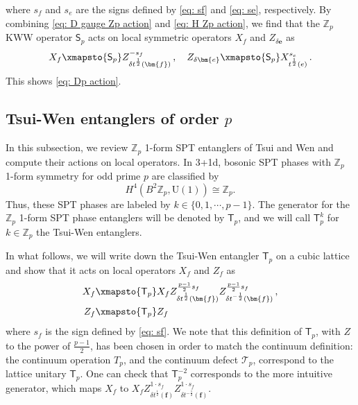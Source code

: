 \documentclass[aps,twocolumn,prx,floatfix,preprintnumbers, nofootinbib,10pt]{revtex4-2}
\numberwithin{equation}{section}
\theoremstyle{definition}
\theoremstyle{remark}
\theoremstyle{claim}
\newcommand{\Z}{{\mathbb Z}}
\newcommand{\mc}[1]{\mathcal{#1}}
\renewcommand{\sf}[1]{\mathsf{#1}}
\begin{document}
where $s_f$ and $s_e$ are the signs defined by \eqref{eq: sf} and \eqref{eq: se}, respectively.
By combining \eqref{eq: D gauge Zp action} and \eqref{eq: H Zp action}, we find that the $\mathbb{Z}_p$ KWW operator $\mathsf{S}_p$ acts on local symmetric operators $X_f$ and $Z_{\delta \bm{e}}$ as
\begin{equation}
X_f \xmapsto{\sf{S}_p} Z_{\delta t^{\frac{1}{2}}(\bm{f})}^{-s_f} \,, \quad
Z_{\delta \bm{e}} \xmapsto{\sf{S}_p} X_{t^{\frac{1}{2}}(e)}^{s_e} \,.
\end{equation}
This shows \eqref{eq: Dp action}.


\subsection{Tsui-Wen entanglers of order $p$}
\label{sec: Zp Tsui-Wen entanglers}

In this subsection, we review $\mathbb{Z}_p$ 1-form SPT entanglers of Tsui and Wen \cite{Tsui:2019ykk} and compute their actions on local operators.
In 3+1d, bosonic SPT phases with $\mathbb{Z}_p$ 1-form symmetry for odd prime $p$ are classified by~\cite{Kapustin:2013uxa}
\begin{equation}
H^4(B^2\mathbb{Z}_p, \mathrm{U}(1)) \cong \mathbb{Z}_p.
\end{equation}
Thus, these SPT phases are labeled by $k \in \{0, 1, \cdots, p-1\}$.
The generator for the $\mathbb{Z}_p$ 1-form SPT phase entanglers will be denoted by $\sf{T}_p$, and we will call $\sf{T}_p^k$ for $k \in \Z_p$ the Tsui-Wen entanglers.

In what follows, we will write down the Tsui-Wen entangler $\sf{T}_p$ on a cubic lattice and show that it acts on local operators $X_f$ and $Z_f$ as
\begin{align}\label{eq: Tpk action}
 X_f &\xmapsto{\sf{T}_p} X_f Z_{\delta t^{\frac{1}{2}}(\bm{f})}^{\frac{p - 1}{2} s_f} Z_{\delta t^{-\frac{1}{2}}(\bm{f})}^{\frac{p - 1}{2} s_f} \,, \nonumber \\
 Z_f &\xmapsto{\sf{T}_p} Z_f
\end{align}
where $s_f$ is the sign defined by \eqref{eq: sf}. We note that this definition of $\sf{T}_p$, with $Z$ to the power of $\frac{p - 1}{2}$, has been chosen in order to match the continuum definition: the continuum operation $T_p$, and the continuum defect $\mc{T}_p$, correspond to the lattice unitary $\sf{T}_p$. One can check that $\sf{T}_p^{-2}$ corresponds to the more intuitive generator, which maps $X_f$ to $X_f Z_{\delta t^{\frac{1}{2}}(\bm{f})}^{1 \cdot s_f} Z_{\delta t^{-\frac{1}{2}}(\bm{f})}^{1 \cdot s_f}$.
\end{document}
